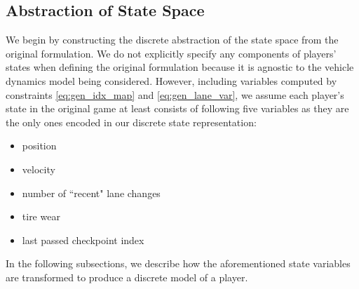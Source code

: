\subsection{Abstraction of State Space} \label{section:discstate}
We begin by constructing the discrete abstraction of the state space from the original formulation. We do not explicitly specify any components of players' states when defining the original formulation because it is agnostic to the vehicle dynamics model being considered. However, including variables computed by constraints \eqref{eq:gen_idx_map} and \eqref{eq:gen_lane_var}, we assume each player's state in the original game at least consists of following five variables as they are the only ones encoded in our discrete state representation:
\begin{itemize}
    \item position
    \item velocity
    \item number of ``recent" lane changes
    \item tire wear
    \item last passed checkpoint index
\end{itemize}
In the following subsections, we describe how the aforementioned state variables are transformed to produce a discrete model of a player.

